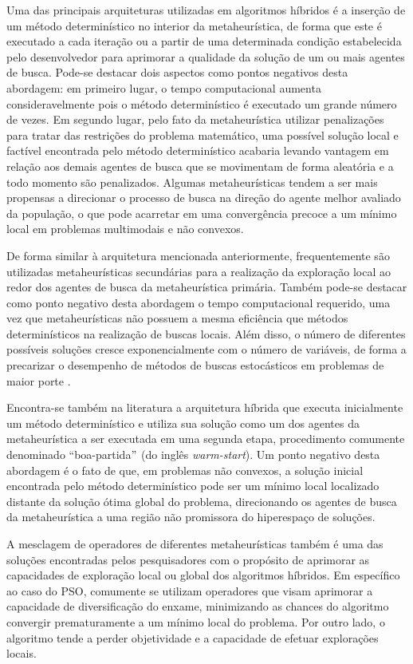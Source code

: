 \documentclass[
	12pt,				%
	openany,			%
	twoside,			%
	a4paper,			%
	chapter=TITLE,		%
	section=Title,		%
	subsection=Title,	%
	subsubsection=Title,%
	english,			%
	french,				%
	spanish,			%
	brazil			%
	]{abntex2}
\begin{document}
\begin{ERRATA}
Uma das principais arquiteturas utilizadas em algoritmos híbridos é a inserção de um método determinístico no interior da metaheurística, de forma que este é executado a cada iteração ou a partir de uma determinada condição estabelecida pelo desenvolvedor para aprimorar a qualidade da solução de um ou mais agentes de busca. Pode-se destacar dois aspectos como pontos negativos desta abordagem: em primeiro lugar, o tempo computacional aumenta consideravelmente pois o método determinístico é executado um grande número de vezes. Em segundo lugar, pelo fato da metaheurística utilizar penalizações para tratar das restrições do problema matemático, uma possível solução local e factível encontrada pelo método determinístico acabaria levando vantagem em relação aos demais agentes de busca que se movimentam de forma aleatória e a todo momento são penalizados. Algumas metaheurísticas tendem a ser mais propensas a direcionar o processo de busca na direção do agente melhor avaliado da população, o que pode acarretar em uma convergência precoce a um mínimo local em problemas multimodais e não convexos. 

De forma similar à arquitetura mencionada anteriormente, frequentemente são utilizadas metaheurísticas secundárias para a realização da exploração local ao redor dos agentes de busca da metaheurística primária. Também pode-se destacar como ponto negativo desta abordagem o tempo computacional requerido, uma vez que metaheurísticas não possuem a mesma eficiência que métodos determinísticos na realização de buscas locais. Além disso, o número de diferentes possíveis soluções cresce exponencialmente com o número de variáveis, de forma a precarizar o desempenho de métodos de buscas estocásticos em problemas de maior porte \cite{high_dim, maldicao}. 

Encontra-se também na literatura a arquitetura híbrida que executa inicialmente um método determinístico e utiliza sua solução como um dos agentes da metaheurística a ser executada em uma segunda etapa, procedimento comumente denominado ``boa-partida$"$ (do inglês \emph{warm-start}). Um ponto negativo desta abordagem é o fato de que, em problemas não convexos, a solução inicial encontrada pelo método determinístico pode ser um mínimo local localizado distante da solução ótima global do problema, direcionando os agentes de busca da metaheurística a uma região não promissora do hiperespaço de soluções.

A mesclagem de operadores de diferentes metaheurísticas também é uma das soluções encontradas pelos pesquisadores com o propósito de aprimorar as capacidades de exploração local ou global dos algoritmos híbridos. Em específico ao caso do PSO, comumente se utilizam operadores que visam aprimorar a capacidade de diversificação do enxame, minimizando as chances do algoritmo convergir prematuramente a um mínimo local do problema. Por outro lado, o algoritmo tende a perder objetividade e a capacidade de efetuar explorações locais.


\end{ERRATA}
\end{document}
